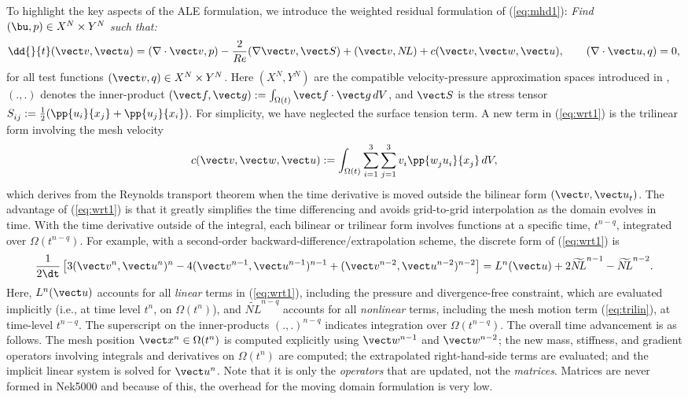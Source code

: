 To highlight the key aspects of the ALE formulation, we introduce
the weighted residual formulation of (\ref{eq:mhd1}):
{\em Find \((\bu,p) \in X^N \times Y^N\) such that:}
\begin{eqnarray} \label{eq:wrt1}
\dd{}{t} (\vect v,\vect u) = (\nabla \cdot \vect v,p) - \frac{2}{Re}(\nabla \vect v,\vect S)
+(\vect v,N\!L) + c(\vect v,\vect w,\vect u),
\qquad
(\nabla \cdot \vect u,q) = 0,
\end{eqnarray} 
for all test functions \((\vect v,q) \in X^N \times Y^N\).
Here \((X^N,Y^N)\) are the compatible velocity-pressure approximation 
spaces introduced in \cite{mapa89}, 
\((.,.)\) denotes the inner-product
\((\vect f,\vect g) := \int_{\Omega(t)} \vect f \cdot \vect g \,dV\),
and 
\(\vect S\) is the stress tensor 
\(S_{ij}^{} := \frac{1}{2}( \pp{u_i}{x_j} + \pp{u_j}{x_i} )\).
For simplicity, we have neglected the surface tension term.
A new term in (\ref{eq:wrt1}) is the trilinear form
involving the mesh velocity
\begin{eqnarray} \label{eq:trilin}
c(\vect v,\vect w,\vect u) :=
\int_{\Omega(t)}^{}
\sum_{i=1}^3 
\sum_{j=1}^3 v_i^{} \pp{w_j^{} u_i^{}}{x_j^{}} \,dV,
\end{eqnarray} 
which derives from the Reynolds transport theorem when
the time derivative is moved outside the bilinear form \((\vect v,\vect u_t^{})\).
The advantage of (\ref{eq:wrt1}) is that it greatly simplifies the
time differencing and avoids grid-to-grid interpolation as the domain
evolves in time.  With the time derivative outside of the integral, 
each bilinear or trilinear form involves functions at a specific time,
\(t^{n-q}\), integrated over \(\Omega(t^{n-q})\).
For example, with a second-order backward-difference/extrapolation scheme,
the discrete form of (\ref{eq:wrt1}) is
\begin{eqnarray} \label{eq:bdk}
\frac{1}{2 \dt}\left[ 
 3 (\vect v^n,\vect u^n)^n
-4 (\vect v^{n-1},\vect u^{n-1})^{n-1}
 + (\vect v^{n-2},\vect u^{n-2})^{n-2} \right]
= L^n (\vect u) + 
2 \widetilde{N\!L}^{n-1}
- \widetilde{N\!L}^{n-2}.
\end{eqnarray} 
Here, \(L^n(\vect u)\) accounts for all {\em linear} terms in (\ref{eq:wrt1}),
including the pressure and divergence-free constraint, which are evaluated
implicitly (i.e., at time level \(t^n\), on \(\Omega(t^n)\)), and
\(\widetilde{N\!L}^{n-q}\) accounts for all {\em nonlinear} terms, including
the mesh motion term (\ref{eq:trilin}), at time-level \(t^{n-q}\).
The superscript on the inner-products \((.,.)^{n-q}\) indicates 
integration over \(\Omega(t^{n-q})\). 
The overall time advancement is as follows.  
The mesh position \(\vect x^n \in \Omega(t^n)\) is computed
explicitly using \(\vect w^{n-1}\) and \(\vect w^{n-2}\);
the new mass, stiffness, and gradient operators involving integrals
and derivatives on \(\Omega(t^n)\) are computed;  
the extrapolated right-hand-side terms are evaluated; and 
the implicit linear system is solved for \(\vect u^n\).   
Note that it is only the {\em operators} that are updated,
not the {\em matrices}.  Matrices are never formed in Nek5000 and
because of this, the overhead for the moving domain formulation
is very low.

